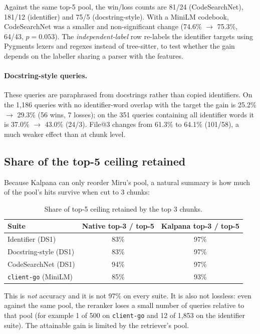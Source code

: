 \documentclass[11pt, a4paper]{article}
\begin{document}
Against the same top-5 pool, the win/loss counts are 81/24 (CodeSearchNet), 181/12 (identifier) and 75/5 (docstring-style). With a MiniLM codebook, CodeSearchNet was a smaller and non-significant change (74.6\% $\to$ 75.3\%, 64/43, $p=0.053$). The \emph{independent-label} row re-labels the identifier targets using Pygments lexers and regexes instead of tree-sitter, to test whether the gain depends on the labeller sharing a parser with the features.

\paragraph{Docstring-style queries.} These queries are paraphrased from docstrings rather than copied identifiers. On the 1,186 queries with no identifier-word overlap with the target the gain is 25.2\% $\to$ 29.3\% (56 wins, 7 losses); on the 351 queries containing all identifier words it is 37.0\% $\to$ 43.0\% (24/3). File@3 changes from 61.3\% to 64.1\% (101/58), a much weaker effect than at chunk level.

\subsection{Share of the top-5 ceiling retained}
Because Kalpana can only reorder Miru's pool, a natural summary is how much of the pool's hits survive when cut to 3 chunks:

\begin{table}[h]
\centering
\begin{tabular}{@{}lcc@{}}
\toprule
\textbf{Suite} & \textbf{Native top-3 / top-5} & \textbf{Kalpana top-3 / top-5} \\ \midrule
Identifier (DS1) & 83\% & 97\% \\
Docstring-style (DS1) & 83\% & 97\% \\
CodeSearchNet (DS1) & 94\% & 97\% \\
\texttt{client-go} (MiniLM) & 85\% & 93\% \\ \bottomrule
\end{tabular}
\caption{Share of top-5 ceiling retained by the top 3 chunks.}
\end{table}

This is \emph{not} accuracy and it is not 97\% on every suite. It is also not lossless: even against the same pool, the reranker loses a small number of queries relative to that pool (for example 1 of 500 on \texttt{client-go} and 12 of 1,853 on the identifier suite). The attainable gain is limited by the retriever's pool.
\end{document}
